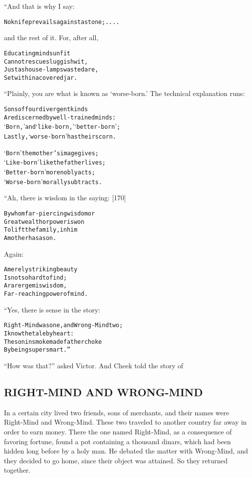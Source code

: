 \documentclass{article}
\renewenvironment{verbatim}{\begin{alltt}\normalfont\begin{centering}}{\end{centering}\end{alltt}}
\begin{document}
“And that is why I say:

\begin{verbatim}
No knife prevails against a stone; ....
\end{verbatim}
and the rest of it. For, after all,

\begin{verbatim}
Educating minds unfit
Cannot rescue sluggish wit,
Just as house-lamps wasted are,
Set within a covered jar.
\end{verbatim}
“Plainly, you are what is known as `worse-born.' The technical
explanation runs:

\begin{verbatim}
Sons of four divergent kinds
Are discerned by well-trained minds:
‘Born,’ and ‘like-born,’ ‘better-born’;
Lastly, ‘worse-born’ has their scorn.

‘Born’ the mother's image gives;
‘Like-born’ like the father lives;
‘Better-born’ more nobly acts;
‘Worse-born’ morally subtracts.
\end{verbatim}
“Ah, there is wisdom in the saying: [170]

\begin{verbatim}
By whom far-piercing wisdom or
    Great wealth or power is won
To lift the family, in him
    A mother has a son.
\end{verbatim}
Again:

\begin{verbatim}
A merely striking beauty
    Is not so hard to find;
A rarer gem is wisdom,
    Far-reaching power of mind.
\end{verbatim}
“Yes, there is sense in the story:

\begin{verbatim}
Right-Mind was one, and Wrong-Mind two;
    I know the tale by heart:
The son in smoke made father choke
    By being supersmart.”
\end{verbatim}
``How was that?'' asked Victor. And Cheek told the story of

\subsection{RIGHT-MIND AND WRONG-MIND}

In a certain city lived two friends, sons of merchants, and their
names were Right-Mind and Wrong-Mind. These two traveled to another
country far away in order to earn money. There the one named
Right-Mind, as a consequence of favoring fortune, found a pot
containing a thousand dinars, which had been hidden long before by
a holy man. He debated the matter with Wrong-Mind, and they decided
to go home, since their object was attained. So they returned
together.
\end{document}
